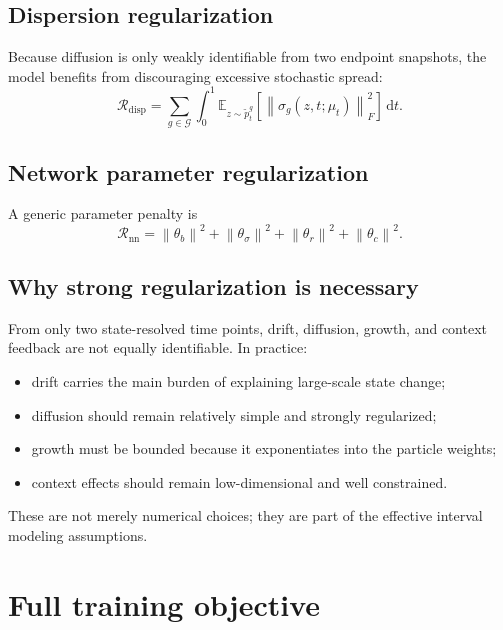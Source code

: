 \documentclass[11pt]{article}
\newcommand{\E}{\mathbb{E}}
\newcommand{\dd}{\,\mathrm{d}}
\newcommand{\Gcal}{\mathcal{G}}
\newcommand{\norm}[1]{\left\lVert #1 \right\rVert}
\begin{document}
\subsection{Dispersion regularization}

Because diffusion is only weakly identifiable from two endpoint snapshots, the model benefits from discouraging excessive stochastic spread:
\begin{equation}
\mathcal{R}_{\mathrm{disp}}
=
\sum_{g\in\Gcal}
\int_0^1
\E_{z\sim\tilde p_t^g}
\left[
\norm{\sigma_g(z,t;\mu_t)}_F^2
\right]
\dd t.
\label{eq:R_disp}
\end{equation}

\subsection{Network parameter regularization}

A generic parameter penalty is
\begin{equation}
\mathcal{R}_{\mathrm{nn}}
=
\norm{\theta_b}^2
+
\norm{\theta_\sigma}^2
+
\norm{\theta_r}^2
+
\norm{\theta_c}^2.
\label{eq:R_nn}
\end{equation}

\subsection{Why strong regularization is necessary}

From only two state-resolved time points, drift, diffusion, growth, and context feedback are not equally identifiable. In practice:
\begin{itemize}[leftmargin=2em]
    \item drift carries the main burden of explaining large-scale state change;
    \item diffusion should remain relatively simple and strongly regularized;
    \item growth must be bounded because it exponentiates into the particle weights;
    \item context effects should remain low-dimensional and well constrained.
\end{itemize}
These are not merely numerical choices; they are part of the effective interval modeling assumptions.

\section{Full training objective}
\end{document}
